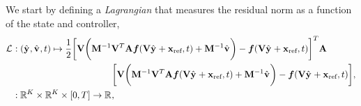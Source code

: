 We start by defining a \textit{Lagrangian} that measures the residual norm as a function of the state and controller, 
\begin{equation}\label{eq:obj_controller}
\begin{split}
 \objectiveControlArg{} &:  (\genstateyDiscreteArgnt{},\controllerDiscreteDumArgnt{},t)
\mapsto \frac{1}{2} \bigg[ \basisspace \bigg(  \mass^{-1}\basisspace^T
\stweightingMatArgt{n}{t}  \velocity(\basisspace \genstateyDiscreteArgnt{} +
\stateIntercept,t) + \mass^{-1}\controllerDiscreteDumArgnt{} \bigg) -
\velocity(\basisspace \genstateyDiscreteArgnt{} + \stateIntercept,t) \bigg]^T
\stweightingMatArgt{n}{t}  \\ & \hspace{1.5 in}\bigg[ \basisspace \bigg(
\mass^{-1}\basisspace^T \stweightingMatArgt{n}{t}\velocity(\basisspace
\genstateyDiscreteArgnt{} + \stateIntercept,t) + \mass^{-1}\controllerDiscreteDumArgnt{}
\bigg) - \velocity( \basisspace  \genstateyDiscreteArgnt{} + \stateIntercept,t ) \bigg]
, \nonumber \\ & : \RR{\romdim} \times \RR{\romdim} \times [0,T] \rightarrow \RR{},
\end{split}
\end{equation}
